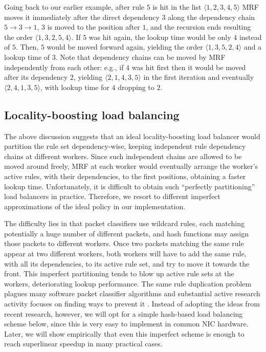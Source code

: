 Going back to our earlier example, after rule $5$ is hit in the list $\langle1, 2, 3, 4, 5\rangle$ MRF moves it immediately after the direct dependency $3$ along the dependency chain $5\to 3\to 1$, $3$ is moved to the position after $1$, and the recursion ends resulting the order $\langle1, 3, 2, 5, 4\rangle$. If $5$ was hit again, the lookup time would be only $4$ instead of $5$. Then, $5$ would be moved forward again, yielding the order $\langle1, 3, 5, 2, 4\rangle$ and a lookup time of $3$. Note that dependency chains can be moved by MRF independently from each other: e.g., if $4$ was hit first then it would be moved after its dependency $2$, yielding $\langle2, 1, 4, 3, 5\rangle$ in the first iteration and eventually $\langle2, 4, 1, 3, 5\rangle$, with lookup time for $4$ dropping to $2$.

\subsection{Locality-boosting load balancing}
\label{sec:sa-rss}

The above discussion suggests that an ideal locality-boosting load balancer would partition the rule set dependency-wise, keeping independent rule dependency chains at different workers. Since such independent chains are allowed to be moved around freely, MRF at each worker would eventually arrange the worker's active rules, with their dependencies, to the first positions, obtaining a faster lookup time. Unfortunately, it is difficult to obtain such ``perfectly partitioning'' load balancers in practice. Therefore, we resort to different imperfect approximations of the ideal policy in our implementation.

The difficulty lies in that packet classifiers use wildcard rules, each matching potentially a huge number of different packets, and hash functions may assign those packets to different workers. Once two packets matching the same rule appear at two different workers, both workers will have to add the same rule, with all its dependencies, to its active rule set, and try to move it towards the front. This imperfect partitioning tends to blow up active rule sets at the workers, deteriorating lookup performance. The same rule duplication problem plagues many software packet classifier algorithms and substantial active research activity focuses on finding ways to prevent it \cite{10.1145/863955.863980, 820051, 10.1145/1851182.1851208, 8485947}. Instead of adopting the ideas from recent research, however, we will opt for a simple hash-based load balancing scheme below, since this is very easy to implement in common NIC hardware. Later, we will show empirically that even this imperfect scheme is enough to reach superlinear speedup in many practical cases.

